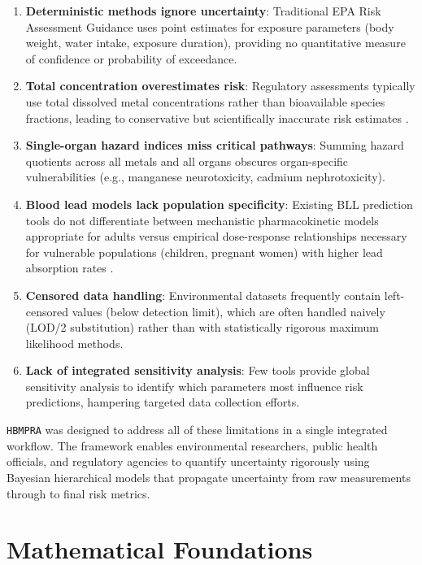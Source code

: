 \documentclass[11pt,a4paper]{article}
\begin{document}
\begin{enumerate}
    \item \textbf{Deterministic methods ignore uncertainty}: Traditional EPA Risk Assessment Guidance \citep{USEPA:1989} uses point estimates for exposure parameters (body weight, water intake, exposure duration), providing no quantitative measure of confidence or probability of exceedance.

    \item \textbf{Total concentration overestimates risk}: Regulatory assessments typically use total dissolved metal concentrations rather than bioavailable species fractions, leading to conservative but scientifically inaccurate risk estimates \citep{Nordstrom:2014}.

    \item \textbf{Single-organ hazard indices miss critical pathways}: Summing hazard quotients across all metals and all organs obscures organ-specific vulnerabilities (e.g., manganese neurotoxicity, cadmium nephrotoxicity).

    \item \textbf{Blood lead models lack population specificity}: Existing BLL prediction tools do not differentiate between mechanistic pharmacokinetic models appropriate for adults versus empirical dose-response relationships necessary for vulnerable populations (children, pregnant women) with higher lead absorption rates \citep{ATSDR:2020}.

    \item \textbf{Censored data handling}: Environmental datasets frequently contain left-censored values (below detection limit), which are often handled naively (LOD/2 substitution) rather than with statistically rigorous maximum likelihood methods.

    \item \textbf{Lack of integrated sensitivity analysis}: Few tools provide global sensitivity analysis to identify which parameters most influence risk predictions, hampering targeted data collection efforts.
\end{enumerate}

\texttt{HBMPRA} was designed to address all of these limitations in a single integrated workflow. The framework enables environmental researchers, public health officials, and regulatory agencies to quantify uncertainty rigorously using Bayesian hierarchical models that propagate uncertainty from raw measurements through to final risk metrics.

\section{Mathematical Foundations}
\end{document}
